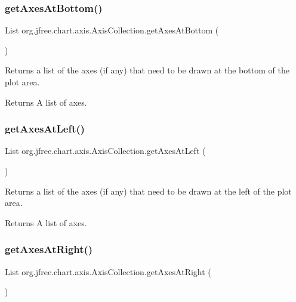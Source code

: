\subsubsection{\texorpdfstring{get\+Axes\+At\+Bottom()}{getAxesAtBottom()}}
{\footnotesize\ttfamily List org.\+jfree.\+chart.\+axis.\+Axis\+Collection.\+get\+Axes\+At\+Bottom (\begin{DoxyParamCaption}{ }\end{DoxyParamCaption})}

Returns a list of the axes (if any) that need to be drawn at the bottom of the plot area.

\begin{DoxyReturn}{Returns}
A list of axes. 
\end{DoxyReturn}
\mbox{\label{classorg_1_1jfree_1_1chart_1_1axis_1_1_axis_collection_a4c28425586df286844046931e1701a52}} 
\subsubsection{\texorpdfstring{get\+Axes\+At\+Left()}{getAxesAtLeft()}}
{\footnotesize\ttfamily List org.\+jfree.\+chart.\+axis.\+Axis\+Collection.\+get\+Axes\+At\+Left (\begin{DoxyParamCaption}{ }\end{DoxyParamCaption})}

Returns a list of the axes (if any) that need to be drawn at the left of the plot area.

\begin{DoxyReturn}{Returns}
A list of axes. 
\end{DoxyReturn}
\mbox{\label{classorg_1_1jfree_1_1chart_1_1axis_1_1_axis_collection_a1ba84e35d8e980fdc84f6cd80b11d2d2}} 
\subsubsection{\texorpdfstring{get\+Axes\+At\+Right()}{getAxesAtRight()}}
{\footnotesize\ttfamily List org.\+jfree.\+chart.\+axis.\+Axis\+Collection.\+get\+Axes\+At\+Right (\begin{DoxyParamCaption}{ }\end{DoxyParamCaption})}

